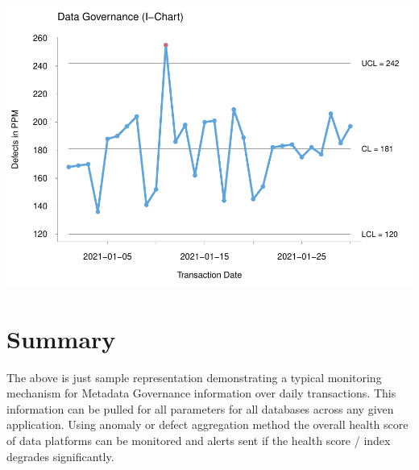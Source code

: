 \documentclass[
]{article}
\begin{document}
\includegraphics{_manage_MetadataGovernance_files/figure-latex/unnamed-chunk-2-1.pdf}

\hypertarget{summary}{%
\section{Summary}\label{summary}}

The above is just sample representation demonstrating a typical
monitoring mechanism for Metadata Governance information over daily
transactions. This information can be pulled for all parameters for all
databases across any given application. Using anomaly or defect
aggregation method the overall health score of data platforms can be
monitored and alerts sent if the health score / index degrades
significantly.
\end{document}
